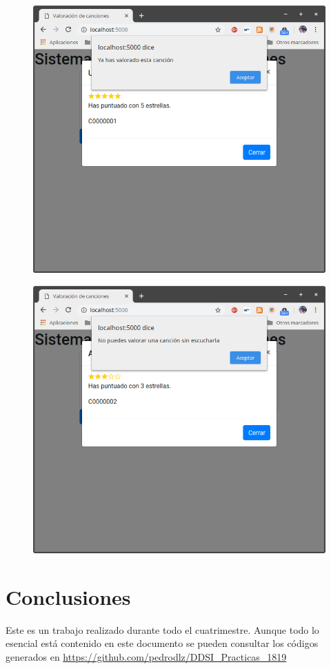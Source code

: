 \documentclass[12pt,a4paper]{article}
\begin{document}
\begin{figure}[H]
\centering
\includegraphics[scale=0.40]{implementaciones/implementacion_javier/imagenes/duplicada.png}
\end{figure}

\begin{figure}[H]
\centering
\includegraphics[scale=0.40]{implementaciones/implementacion_javier/imagenes/no_escuchada.png}
\end{figure}

\section{Conclusiones}
Este es un trabajo realizado durante todo el cuatrimestre. Aunque todo lo esencial está contenido en este documento se pueden consultar los códigos generados en \url{https://github.com/pedrodlz/DDSI_Practicas_1819}
\end{document}
